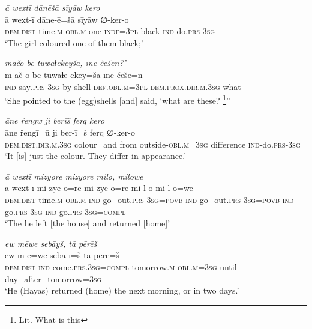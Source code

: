\ea \label{ŽH.83}
\textit{ā wextī dānēšā sīyāw kero} \\ 
\gll ā wext-ī dāne-ē=šā sīyāw ∅-ker-o \\ 
 \textsc{dem.dist} time\textsc{.m}\textsc{-obl}\textsc{.m} one\textsc{-indf}\textsc{=3pl} black \textsc{ind-}do\textsc{.prs}\textsc{-3sg} \\ 
\glt `The girl coloured one of them black;'
\z 
 
\ea \label{ŽH.86}
\textit{māčo be tūwāɫekeyšā, īne čēšen?’} \\ 
\gll m-āč-o be tūwāɫe-ekey=šā īne čēše=n \\ 
 \textsc{ind-}say\textsc{.prs}\textsc{-3sg} by shell\textsc{-def}\textsc{.obl}\textsc{.m}\textsc{=3pl} \textsc{dem.prox}\textsc{.dir}\textsc{.m}\textsc{.3sg} what \\ 
\glt `She pointed to the (egg)shells [and] said, ‘what are these? \footnote{Lit. What is this}''
\z 
 
\ea \label{ŽH.100}
\textit{āne řengw ji berīš ferq kero} \\ 
\gll āne řengī=ū ji ber-ī=š ferq ∅-ker-o \\ 
 \textsc{dem.dist}\textsc{.dir}\textsc{.m}\textsc{.3sg} colour=and from outside\textsc{-obl}\textsc{.m}\textsc{=3sg} difference \textsc{ind-}do\textsc{.prs}\textsc{-3sg} \\ 
\glt `It [is] just the colour. They differ in appearance.'
\z 
 
\ea \label{ŽH.106}
\textit{ā wextī mizyore mizyore milo, milowe} \\ 
\gll ā wext-ī mi-zye-o=re mi-zye-o=re mi-l-o mi-l-o=we \\ 
 \textsc{dem.dist} time\textsc{.m}\textsc{-obl}\textsc{.m} \textsc{ind-}go\_out\textsc{.prs}\textsc{-3sg}\textsc{=\textsc{povb}} \textsc{ind-}go\_out\textsc{.prs}\textsc{-3sg}\textsc{=\textsc{povb}} \textsc{ind-}go\textsc{.prs}\textsc{-3sg} \textsc{ind-}go\textsc{.prs}\textsc{-3sg}\textsc{=compl} \\ 
\glt `The he left [the house] and returned [home]'
\z 
 
\ea \label{ŽH.107}
\textit{ew mēwe sebāyš, tā pērēš} \\ 
\gll ew m-ē=we sebā-ī=š tā pērē=š \\ 
 \textsc{dem.dist} \textsc{ind-}come\textsc{.prs}\textsc{.3sg}\textsc{=compl} tomorrow\textsc{.m}\textsc{-obl}\textsc{.m}\textsc{=3sg} until day\_after\_tomorrow\textsc{=3sg} \\ 
\glt `He (Hayas) returned (home) the next morning, or in two days.'
\z 
 
